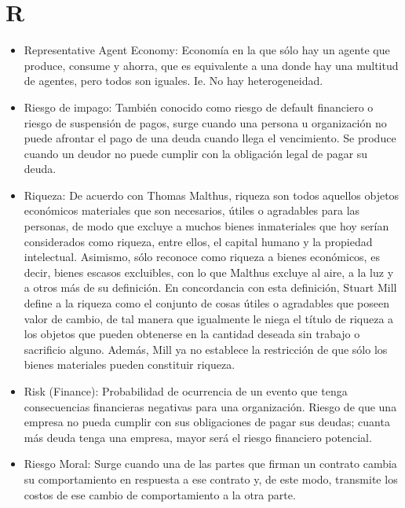 \documentclass{article}
\begin{document}
\section{R}
\begin{itemize}

\item Representative Agent Economy: Economía en la que sólo hay un agente que produce, consume y ahorra, que es equivalente a una donde hay una multitud de agentes, pero todos son iguales. Ie. No hay heterogeneidad.

\item Riesgo de impago: También conocido como riesgo de default financiero o riesgo de suspensión de pagos, surge cuando una persona u organización no puede afrontar el pago de una deuda cuando llega el vencimiento. Se produce cuando un deudor no puede cumplir con la obligación legal de pagar su deuda.

\item Riqueza: De acuerdo con Thomas Malthus, riqueza son todos aquellos objetos económicos materiales que son necesarios, útiles o agradables para las personas, de modo que excluye a muchos bienes inmateriales que hoy serían considerados como riqueza, entre ellos, el capital humano y la propiedad intelectual. Asimismo, sólo reconoce como riqueza a bienes económicos, es decir, bienes escasos excluibles, con lo que Malthus excluye al aire, a la luz y a otros más de su definición. En concordancia con esta definición, Stuart Mill define a la riqueza como el conjunto de cosas útiles o agradables que poseen valor de cambio, de tal manera que igualmente le niega el título de riqueza a los objetos que pueden obtenerse en la cantidad deseada sin trabajo o sacrificio alguno. Además, Mill ya no establece la restricción de que sólo los bienes materiales pueden constituir riqueza.

\item Risk (Finance): Probabilidad de ocurrencia de un evento que tenga consecuencias financieras negativas para una organización. Riesgo de que una empresa no pueda cumplir con sus obligaciones de pagar sus deudas; cuanta más deuda tenga una empresa, mayor será el riesgo financiero potencial.

\item Riesgo Moral: Surge cuando una de las partes que firman un contrato cambia su comportamiento en respuesta a ese contrato y, de este modo, transmite los costos de ese cambio de comportamiento a la otra parte.

\end{itemize}
\end{document}
